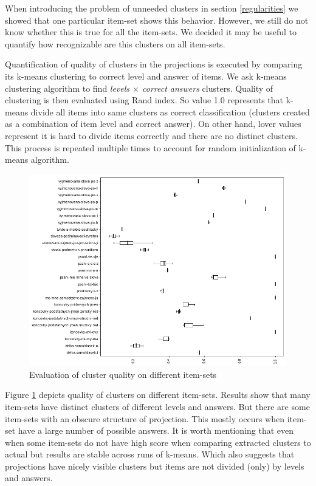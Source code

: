 \documentclass[
  digital, %
  table,   %
  nolof,     %
  nolot,     %
  nocover,
  color
]{fithesis3}
\begin{document}
When introducing the problem of unneeded clusters in section \ref{regularities} we showed that one particular item-set shows this behavior. However, we still do not know whether this is true for all the item-sets. We decided it may be useful to quantify how recognizable are this clusters on all item-sets.


Quantification of quality of clusters in the projections is executed by comparing its k-means clustering to correct level and answer of items. We ask k-means clustering algorithm to find \textit{levels $\times$ correct answers} clusters. Quality of clustering is then evaluated using Rand index. So value 1.0 represents that k-means divide all items into same clusters as correct classification (clusters created as a combination of item level and correct answer). On other hand, lover values represent it is hard to divide items correctly and there are no distinct clusters. This process is repeated multiple times to account for random initialization of k-means algorithm.

\begin{figure}
  \includegraphics[width=\textwidth]{img/clustering_quality}
  \caption{Evaluation of cluster quality on different item-sets}
  \label{fig:clustering_quality}
\end{figure}

Figure \ref{fig:clustering_quality} depicts quality of clusters on different item-sets. Results show that many item-sets have distinct clusters of different levels and answers. But there are some item-sets with an obscure structure of projection. This mostly occurs when item-set have a large number of possible answers. It is worth mentioning that even when some item-sets do not have high score when comparing extracted clusters to actual but results are stable across runs of k-means. Which also suggests that projections have nicely visible clusters but items are not divided (only) by levels and answers.
\end{document}
